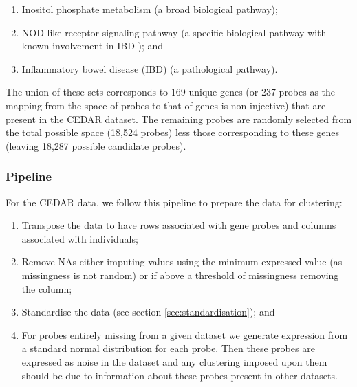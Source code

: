 \documentclass[12pt]{article} %
\begin{document}
	\begin{enumerate} \label{list:kegg_pathways}
		\item Inositol phosphate metabolism (a broad biological pathway);
		\item NOD-like receptor signaling pathway (a specific biological pathway with known involvement in IBD \cite{CarneiroNodlikeproteinsinflammation2008}\cite{GarrettHomeostasisInflammationIntestine2010}); and
		\item Inflammatory bowel disease (IBD) (a pathological pathway).
	\end{enumerate}

The union of these sets corresponds to 169 unique genes (or 237 probes as the mapping from the space of probes to that of genes is non-injective) that are present in the CEDAR dataset. The remaining probes are randomly selected from the total possible space (18,524 probes) less those corresponding to these genes (leaving 18,287 possible candidate probes).

	 	\subsubsection{Pipeline}
For the CEDAR data, we follow this pipeline to prepare the data for clustering:
\begin{enumerate} \label{list:methods}
	\item Transpose the data to have rows associated with gene probes and columns associated with individuals;
	\item Remove NAs either imputing values using the minimum expressed value (as missingness is not random) or if above a threshold of missingness removing the column;
	\item Standardise the data (see section \ref{sec:standardisation}); and
	\item For probes entirely missing from a given dataset we generate expression from a standard normal distribution for each probe. Then these probes are expressed as noise in the dataset and any clustering imposed upon them should be due to information about these probes present in other datasets. %
\end{enumerate}
\end{document}
